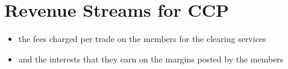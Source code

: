 \section{Revenue Streams for CCP}
\begin{itemize}
	\item the fees charged per trade on the members for the clearing services
	\item and the interests that they earn on the margins posted by the members
\end{itemize}
